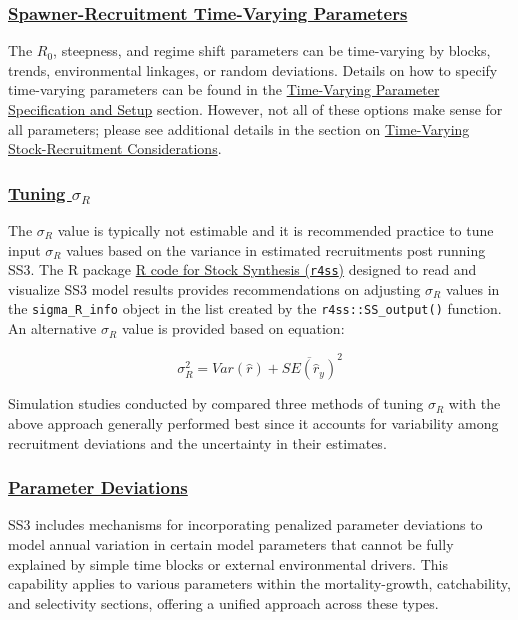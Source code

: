 \hypertarget{SRR-TV}{}
\subsubsection[Spawner-Recruitment Time-Varying Parameters]{\protect\hyperlink{SRR-TV}{Spawner-Recruitment Time-Varying Parameters}}

The $R_{0}$, steepness, and regime shift parameters can be time-varying by blocks, trends, environmental linkages, or random deviations. Details on how to specify time-varying parameters can be found in the \hyperlink{tvOrder}{Time-Varying Parameter Specification and Setup} section. However, not all of these options make sense for all parameters; please see additional details in the section on \hyperlink{tv-sr}{Time-Varying Stock-Recruitment Considerations}.

\hypertarget{TuneSigmaR}{}
\subsubsection[Tuning $\sigma_R$]{\protect\hyperlink{TuneSigmaR}{Tuning $\sigma_R$}}
The $\sigma_R$ value is typically not estimable and it is recommended practice to tune input $\sigma_R$ values based on the variance in estimated recruitments post running SS3. The R package \href{https://github.com/r4ss/r4ss}{R code for Stock Synthesis (\texttt{r4ss})} designed to read and visualize SS3 model results provides recommendations on adjusting $\sigma_R$ values in the \texttt{sigma\_R\_info} object in the list created by the \texttt{r4ss::SS\_output()} function. An alternative $\sigma_R$ value is provided based on equation:

\begin{equation}
	\sigma_R^2 = Var(\hat{r}) + \overline{SE(\hat{r}_y)}^2
\end{equation}

Simulation studies conducted by \citet{methot-adjusting-2011} compared three methods of tuning $\sigma_R$ with the above approach generally performed best since it accounts for variability among recruitment deviations and the uncertainty in their estimates.


\hypertarget{ParmDevs}{}
\subsubsection[Parameter Deviations]{\protect\hyperlink{ParmDevs}{Parameter Deviations}}

SS3 includes mechanisms for incorporating penalized parameter deviations to model annual variation in certain model parameters that cannot be fully explained by simple time blocks or external environmental drivers. This capability applies to various parameters within the mortality-growth, catchability, and selectivity sections, offering a unified approach across these types.

